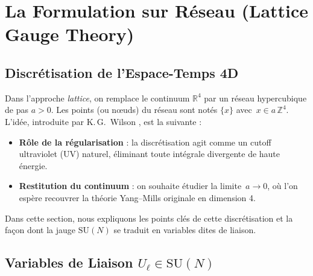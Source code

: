\chapter{La Formulation sur Réseau (Lattice Gauge Theory)}
\label{chap:4}

\section{Discrétisation de l’Espace-Temps 4D}
\label{sec:4.1}

Dans l’approche \emph{lattice}, on remplace le continuum \(\mathbb{R}^4\) par un réseau hypercubique de pas \(a>0\). Les points (ou \og nœuds\fg) du réseau sont notés \(\{x\}\) avec \(\,x \in a\,\mathbb{Z}^4\). L’idée, introduite par K.\,G.~Wilson \cite{Wilson1974-1}, est la suivante :

\begin{itemize}
	\item \textbf{Rôle de la régularisation} : la discrétisation agit comme un cutoff ultraviolet (UV) naturel, éliminant toute intégrale divergente de haute énergie.  
	\item \textbf{Restitution du continuum} : on souhaite étudier la limite \(\,a \to 0\), où l’on espère recouvrer la théorie Yang--Mills originale en dimension 4.
\end{itemize}

Dans cette section, nous expliquons les points clés de cette discrétisation et la façon dont la jauge \(\mathrm{SU}(N)\) se traduit en variables dites \og de liaison\fg.

\vspace{1em}

\section{Variables de Liaison \texorpdfstring{\(U_\ell \in \mathrm{SU}(N)\)}{U_l in SU(N)}}
\label{sec:4.2}

